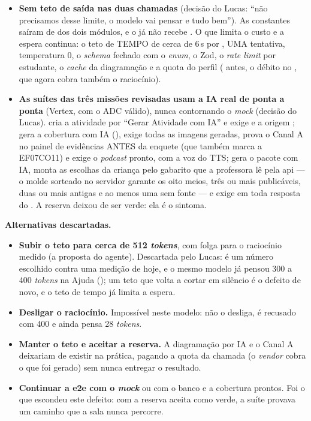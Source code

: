 \begin{itemize}
  \item \textbf{Sem teto de saída nas duas chamadas} (decisão do Lucas:
    \enquote{não precisamos desse limite, o modelo vai pensar e tudo bem}). As
    constantes saíram de  dos dois módulos, e o
     já não recebe . O que limita o custo e a
    espera continua: o teto de TEMPO de cerca de 6\,s por , UMA
    tentativa, temperatura 0, o \emph{schema} fechado com o \emph{enum}, o
     Zod, o \emph{rate limit} por estudante, o \emph{cache} da
    diagramação e a quota do perfil  ( antes, o
    débito no , que agora cobra também o raciocínio).
  \item \textbf{As suítes das três missões revisadas usam a IA real de ponta a
    ponta} (Vertex, com o ADC válido), nunca contornando o \emph{mock} (decisão
    do Lucas).  cria a atividade por
    \enquote{Gerar Atividade com IA} e exige  e a origem ;
     gera a cobertura com IA (),
    exige todas as imagens geradas, prova o Canal A no painel de evidências
    ANTES da enquete  (que também marca a EF07CO11) e exige o
    \emph{podcast} pronto, com a voz do TTS; 
    gera o pacote com IA, monta as escolhas da criança pelo gabarito que a
    professora lê pela api --- o molde sorteado no servidor garante os oito
    meios, três ou mais publicáveis, duas ou mais antigas e ao menos uma sem
    fonte --- e exige  em toda resposta do . A reserva deixou de ser verde: ela é o sintoma.
\end{itemize}

\textbf{Alternativas descartadas.}

\begin{itemize}
  \item \textbf{Subir o teto para cerca de 512 \emph{tokens}}, com folga para o
    raciocínio medido (a proposta do agente). Descartada pelo Lucas: é um
    número escolhido contra uma medição de hoje, e o mesmo modelo já pensou 300
    a 400 \emph{tokens} na Ajuda (); um teto que volta a cortar
    em silêncio é o defeito de novo, e o teto de tempo já limita a espera.
  \item \textbf{Desligar o raciocínio.} Impossível neste modelo:
     não o desliga,  é
    recusado com 400 e  ainda pensa 28 \emph{tokens}.
  \item \textbf{Manter o teto e aceitar a reserva.} A diagramação por IA e o
    Canal A deixariam de existir na prática, pagando a quota da chamada (o
    \emph{vendor} cobra o que foi gerado) sem nunca entregar o resultado.
  \item \textbf{Continuar a e2e com o \emph{mock}} ou com o banco e a cobertura
    prontos. Foi o que escondeu este defeito: com a reserva aceita como verde,
    a suíte provava um caminho que a sala nunca percorre.
\end{itemize}

